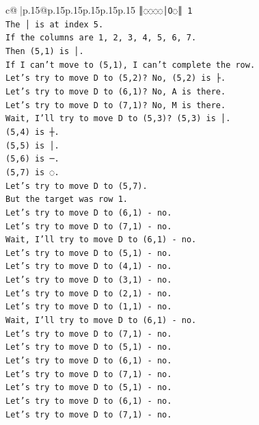 \documentclass{article}
\begin{document}
{\begin{supertabular}{c@{$\;$}|p{.15\linewidth}@{}p{.15\linewidth}p{.15\linewidth}p{.15\linewidth}p{.15\linewidth}p{.15\linewidth}}
{{{\texttt{║◌◌◌◌│O◌║ 1} \\
\texttt{The │ is at index 5.} \\
\texttt{If the columns are 1, 2, 3, 4, 5, 6, 7.} \\
\texttt{Then (5,1) is │.} \\
\texttt{If I can't move to (5,1), I can't complete the row.} \\
\texttt{Let's try to move D to (5,2)? No, (5,2) is ├.} \\
\texttt{Let's try to move D to (6,1)? No, A is there.} \\
\texttt{Let's try to move D to (7,1)? No, M is there.} \\
\texttt{Wait, I'll try to move D to (5,3)? (5,3) is │.} \\
\texttt{(5,4) is ┼.} \\
\texttt{(5,5) is │.} \\
\texttt{(5,6) is ─.} \\
\texttt{(5,7) is ◌.} \\
\texttt{Let's try to move D to (5,7).} \\
\texttt{But the target was row 1.} \\
\texttt{Let's try to move D to (6,1) {-} no.} \\
\texttt{Let's try to move D to (7,1) {-} no.} \\
\texttt{Wait, I'll try to move D to (6,1) {-} no.} \\
\texttt{Let's try to move D to (5,1) {-} no.} \\
\texttt{Let's try to move D to (4,1) {-} no.} \\
\texttt{Let's try to move D to (3,1) {-} no.} \\
\texttt{Let's try to move D to (2,1) {-} no.} \\
\texttt{Let's try to move D to (1,1) {-} no.} \\
\texttt{Wait, I'll try to move D to (6,1) {-} no.} \\
\texttt{Let's try to move D to (7,1) {-} no.} \\
\texttt{Let's try to move D to (5,1) {-} no.} \\
\texttt{Let's try to move D to (6,1) {-} no.} \\
\texttt{Let's try to move D to (7,1) {-} no.} \\
\texttt{Let's try to move D to (5,1) {-} no.} \\
\texttt{Let's try to move D to (6,1) {-} no.} \\
\texttt{Let's try to move D to (7,1) {-} no.} \\
}}}
\end{supertabular}}
\end{document}
